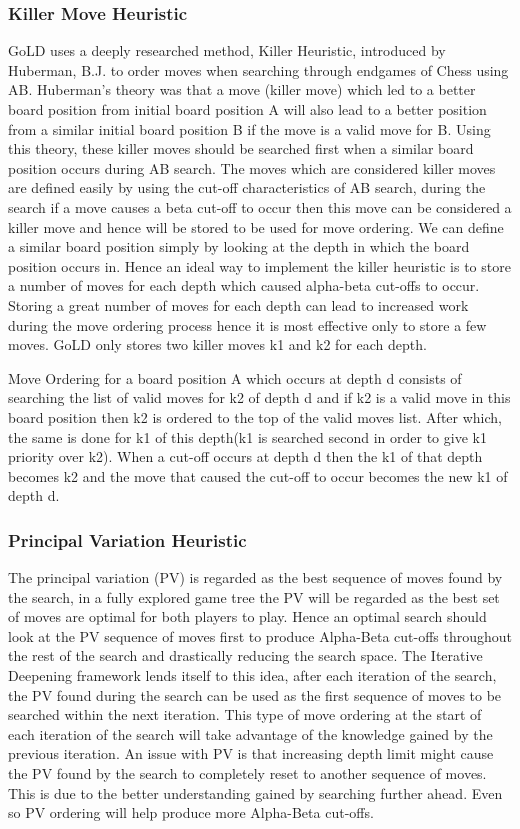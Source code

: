 \documentclass{l4proj}
\begin{document}
\subsubsection{Killer Move Heuristic}
GoLD uses a deeply researched \cite{Akl1977} method, Killer Heuristic, introduced by Huberman, B.J.  \cite{Huberman1968} to order moves when searching through endgames of Chess using AB. Huberman’s theory was that a move (killer move) which led to a better board position from initial board position A will also lead to a better position from a similar initial board position B if the move is a valid move for B.  Using this theory, these killer moves should be searched first when a similar board position occurs during AB search. The moves which are considered killer moves are defined easily by using the cut-off characteristics of AB search, during the search if a move causes a beta cut-off to occur then this move can be considered a killer move and hence will be stored to be used for move ordering.  We can define a similar board position simply by looking at the depth in which the board position occurs in. Hence an ideal way to implement the killer heuristic is to store a number of moves for each depth which caused alpha-beta cut-offs to occur. Storing a great number of moves for each depth can lead to increased work during the move ordering process hence it is most effective only to store a few moves. GoLD only stores two killer moves k1 and k2  for each depth.

Move Ordering for a board position A which occurs at depth d consists of searching the list of valid moves for k2 of depth d and if k2 is a valid move in this board position then k2 is ordered to the top of the valid moves list. After which, the same is done for k1 of this depth(k1 is searched second in order to give k1 priority over k2). When a cut-off occurs at depth d then the k1 of that depth becomes k2 and the move that caused the cut-off to occur becomes the new k1 of depth d.
\subsubsection{Principal Variation Heuristic}
The principal variation (PV) is regarded as the best sequence of moves found by the search, in a fully explored game tree the PV will be regarded as the best set of moves are optimal for both players to play. Hence an optimal search should look at the PV sequence of moves first to produce Alpha-Beta cut-offs throughout the rest of the search and drastically reducing the search space. The Iterative Deepening framework lends itself to this idea, after each iteration of the search, the PV found during the search can be used as the first sequence of moves to be searched within the next iteration. This type of move ordering at the start of each iteration of the search will take advantage of the knowledge gained by the previous iteration. An issue with PV is that increasing depth limit might cause the PV found by the search to completely reset to another sequence of moves. This is due to the better understanding gained by searching further ahead. Even so PV ordering will help produce more Alpha-Beta cut-offs.
\end{document}
